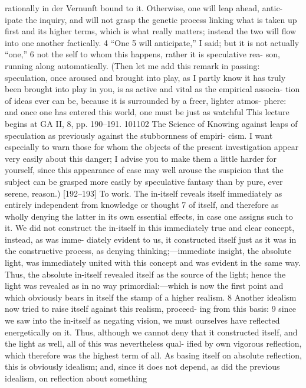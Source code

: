 rationally {in der Vernunft} bound to it. Otherwise, one will leap ahead, antic-
ipate the inquiry, and will not grasp the genetic process linking what is taken
up first and its higher terms, which is what really matters; instead the two will
flow into one another factically. 4 “One 5 will anticipate,” I said; but it is not
actually “one,” 6 not the self to whom this happens, rather it is speculative rea-
son, running along automatically. (Then let me add this remark in passing:
speculation, once aroused and brought into play, as I partly know it has truly
been brought into play in you, is as active and vital as the empirical associa-
tion of ideas ever can be, because it is surrounded by a freer, lighter atmos-
phere: and once one has entered this world, one must be just as watchful
This lecture begins at GA II, 8, pp. 190–191.
101102
The Science of Knowing
against leaps of speculation as previously against the stubbornness of empiri-
cism. I want especially to warn those for whom the objects of the present
investigation appear very easily about this danger; I advise you to make them
a little harder for yourself, since this appearance of ease may well arouse the
suspicion that the subject can be grasped more easily by speculative fantasy
than by pure, ever serene, reason.)
[192–193] To work.
The in-itself reveals itself immediately as entirely independent from
knowledge or thought 7 of itself, and therefore as wholly denying the latter in
its own essential effects, in case one assigns such to it. We did not construct
the in-itself in this immediately true and clear concept, instead, as was imme-
diately evident to us, it constructed itself just as it was in the constructive
process, as denying thinking;—immediate insight, the absolute light, was
immediately united with this concept and was evident in the same way. Thus,
the absolute in-itself revealed itself as the source of the light; hence the light
was revealed as in no way primordial:—which is now the first point and which
obviously bears in itself the stamp of a higher realism. 8
Another idealism now tried to raise itself against this realism, proceed-
ing from this basis: 9 since we saw into the in-itself as negating vision, we must
ourselves have reflected energetically on it. Thus, although we cannot deny
that it constructed itself, and the light as well, all of this was nevertheless qual-
ified by own vigorous reflection, which therefore was the highest term of all.
As basing itself on absolute reflection, this is obviously idealism; and, since it
does not depend, as did the previous idealism, on reflection about something
